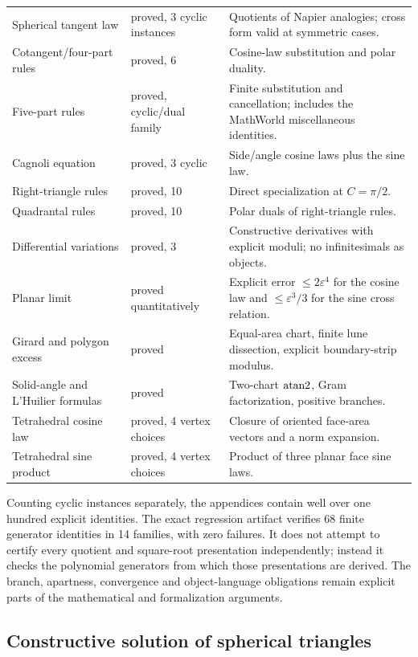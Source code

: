 \begin{longtable}{@{}p{}p{}p{}@{}}
Spherical tangent law & proved, 3 cyclic instances & Quotients of Napier
analogies; cross form valid at symmetric cases.\\
Cotangent/four-part rules & proved, 6 & Cosine-law substitution and polar
duality.\\
Five-part rules & proved, cyclic/dual family & Finite substitution and
cancellation; includes the MathWorld miscellaneous identities.\\
Cagnoli equation & proved, 3 cyclic & Side/angle cosine laws plus the sine
law.\\
Right-triangle rules & proved, 10 & Direct specialization at \(C=\pi/2\).\\
Quadrantal rules & proved, 10 & Polar duals of right-triangle rules.\\
Differential variations & proved, 3 & Constructive derivatives with explicit
moduli; no infinitesimals as objects.\\
Planar limit & proved quantitatively & Explicit error
\(\le2\varepsilon^4\) for the cosine law and
\(\le\varepsilon^3/3\) for the sine cross relation.\\
Girard and polygon excess & proved & Equal-area chart, finite lune dissection,
explicit boundary-strip modulus.\\
Solid-angle and L'Huilier formulas & proved & Two-chart \(\operatorname{atan2}\), Gram
factorization, positive branches.\\
Tetrahedral cosine law & proved, 4 vertex choices & Closure of oriented
face-area vectors and a norm expansion.\\
Tetrahedral sine product & proved, 4 vertex choices & Product of three planar
face sine laws.\\
\bottomrule
\end{longtable}

Counting cyclic instances separately, the appendices contain well over one
hundred explicit identities.  The exact regression artifact verifies 68 finite generator identities in 14
families, with zero failures.  It does not attempt to certify every quotient
and square-root presentation independently; instead it checks the polynomial
generators from which those presentations are derived.  The branch,
apartness, convergence and object-language obligations remain explicit parts
of the mathematical and formalization arguments.

\subsection{Constructive solution of spherical triangles}

